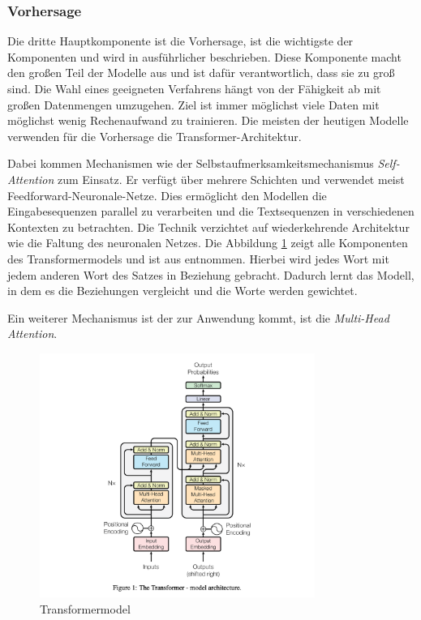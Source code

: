 \subsubsection{Vorhersage}
Die dritte Hauptkomponente ist die Vorhersage, ist die wichtigste der Komponenten und wird in \cite{vaswani-2017} ausführlicher beschrieben. Diese Komponente macht den großen Teil der Modelle aus und ist dafür verantwortlich, dass sie zu groß sind. Die Wahl eines geeigneten Verfahrens hängt von der Fähigkeit ab mit großen Datenmengen umzugehen. Ziel ist immer möglichst viele Daten mit möglichst wenig Rechenaufwand zu trainieren. Die meisten der heutigen Modelle verwenden für die Vorhersage die Transformer-Architektur.\vspace{0.2cm}

Dabei kommen Mechanismen wie der Selbstaufmerksamkeitsmechanismus \textit{Self-Attention} zum Einsatz. Er verfügt über mehrere Schichten und verwendet meist Feedforward-Neuronale-Netze. Dies ermöglicht den Modellen die Eingabesequenzen parallel zu verarbeiten und die Textsequenzen in verschiedenen Kontexten zu betrachten. Die Technik verzichtet auf wiederkehrende Architektur wie die Faltung des neuronalen Netzes. Die Abbildung \ref{img:llm_transformer_model} zeigt alle Komponenten des Transformermodels und ist aus \cite{vaswani-2017} entnommen. Hierbei wird jedes Wort mit jedem anderen Wort des Satzes in Beziehung gebracht. Dadurch lernt das Modell, in dem es die Beziehungen vergleicht und die Worte werden gewichtet.\vspace{0.2cm}

Ein weiterer Mechanismus ist der zur Anwendung kommt, ist die \textit{Multi-Head Attention}.

\begin{center}
	\begin{figure}[!ht]
		\includegraphics[width=0.8\textwidth]{content/chapter_basics/images/llm_transformer_model.png}
		\centering
		\caption{Transformermodel}
		\label{img:llm_transformer_model}
	\end{figure}
\end{center}

